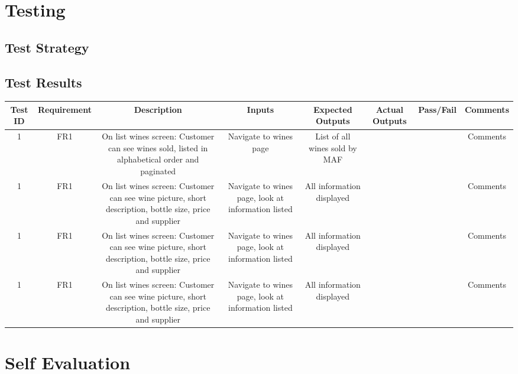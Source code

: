 \documentclass[a4paper,12pt,hidelinks]{report}
\begin{document}
\chapter{Testing}
    \section{Test Strategy}

    \begin{landscape}
        \section{Test Results}
        \begin{center}
            \begin{longtable}{ |c|c|c|c|c|c|c|c| } 
                \hline
                \textbf{Test ID} & \textbf{Requirement} & \textbf{Description} & \textbf{Inputs} & \textbf{Expected Outputs} & \textbf{Actual Outputs} & \textbf{Pass/Fail} & \textbf{Comments}
                \\\hline\hline
                1 & FR1 & On list wines screen: Customer can see wines sold, listed in alphabetical order and paginated & Navigate to wines page & List of all wines sold by MAF & & & Comments\\ \hline
                1 & FR1 & On list wines screen: Customer can see wine picture, short description, bottle size, price and supplier & Navigate to wines page, look at information listed & All information displayed & & & Comments\\ \hline
                1 & FR1 & On list wines screen: Customer can see wine picture, short description, bottle size, price and supplier & Navigate to wines page, look at information listed & All information displayed & & & Comments\\
                1 & FR1 & On list wines screen: Customer can see wine picture, short description, bottle size, price and supplier & Navigate to wines page, look at information listed & All information displayed & & & Comments\\
                \hline
            \end{longtable}
        \end{center}
    \end{landscape}

    \blindtext
\chapter{Self Evaluation}
    \blindtext

\printbibliography
\end{document}
